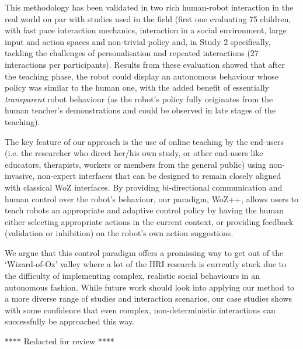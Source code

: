 \documentclass[manuscript, review, anonymous]{acmart}
\newcommand{\ES}[1]{\added[id=ES]{#1}}
\newcommand{\woz}{WoZ++\xspace}
\begin{document}
This methodology has been validated in two rich human-robot interaction in the
real world on par with studies used in the field (first one evaluating 75 children,
with fast pace interaction mechanics, interaction in a social environment, large
input and action spaces and non-trivial policy and, in Study 2 specifically, tackling the challenges
of personalisation and repeated interactions (27 interactions per participants).
Results from these evaluation
showed that after the teaching phase, the robot could display
an autonomous behaviour whose policy was similar to the human one, with the
added benefit of essentially \emph{transparent} robot behaviour (as the
robot's policy fully originates from the human teacher's demonstrations and
could be observed in late stages of the teaching).

The key feature of our approach is the use of online teaching by the end-users
(i.e. the researcher who direct her/his own study, or other end-users like
educators, therapists, workers or members from the general public) using
non-invasive, non-expert interfaces that can be designed to remain closely
aligned with classical WoZ interfaces. By providing bi-directional %
communication and human control over the robot's behaviour,
our paradigm, \woz, allows users to teach robots an appropriate and adaptive
control policy by having the human either selecting appropriate actions in the
current context, or providing feedback (validation or inhibition) on the robot's
own action suggestions.

We argue that this control paradigm offers a promissing way to get out of the
`Wizard-of-Oz' valley where a lot of the HRI research is currently stuck due to
the difficulty of implementing complex, realistic social behaviours in an
autonomous fashion. While future work should look into applying our method to a
more diverse range of studies and interaction scenarios, our case studies shows
with some confidence that even complex, non-deterministic interactions can
successfully be approached this way.


\begin{acks}

**** Redacted for review ****

\end{acks}



\end{document}
